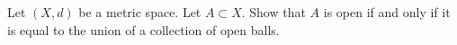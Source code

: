 \begin{problem}
  Let $(X, d)$ be a metric space.
  Let $A \subset X$.
  Show that $A$ is open if and only if it is equal
  to the union of a collection of open balls.
\end{problem}

\begin{answer}

\end{answer}
